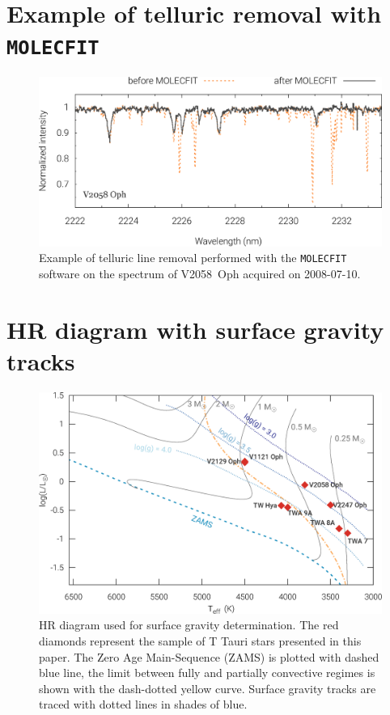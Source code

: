 \documentclass{aa}
\begin{document}
\begin{appendix}
\section{Example of telluric removal with {\tt MOLECFIT}}
\begin{figure}
\centering
\includegraphics[width=1.9\columnwidth]{molecfit-v2058oph.eps}
\caption{
    Example of telluric line removal performed with the {\tt MOLECFIT} software on the spectrum of V2058~Oph acquired on 2008-07-10.
}
\label{figure:molecfit}
\end{figure}

\section{HR diagram with surface gravity tracks}
\begin{figure}
\centering
\includegraphics[width=2.0\columnwidth]{yapsi-logg.eps}
\caption{
    HR diagram used for surface gravity determination. The red diamonds represent the sample of T Tauri stars presented in this paper. The Zero Age Main-Sequence (ZAMS) is plotted with dashed blue line, the limit between fully and partially convective regimes is shown with the dash-dotted yellow curve. Surface gravity tracks are traced with dotted lines in shades of blue.
}
\label{figure:yapsi-logg}
\end{figure}


\end{appendix}
\end{document}
